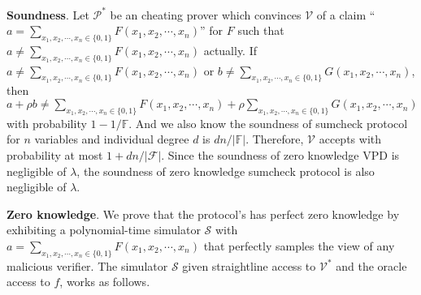 \noindent
\textbf{Soundness}. Let $\mathcal{P}^*$ be an cheating prover which convinces $\mathcal{V}$ of a claim ``$a = \sum\limits_{x_1, x_2, \cdots, x_n \in \{0, 1\}}F(x_1, x_2, \cdots, x_n)$'' for $F$ such that $a \neq \sum\limits_{x_1, x_2, \cdots, x_n \in \{0, 1\}}F(x_1, x_2, \cdots, x_n)$ actually. If $a \neq \sum\limits_{x_1, x_2, \cdots, x_n \in \{0, 1\}}F(x_1, x_2, \cdots, x_n)$ or $b \neq \sum\limits_{x_1, x_2, \cdots, x_n \in \{0, 1\}}G(x_1, x_2, \cdots, x_n)$, then $a + \rho b \neq \sum\limits_{x_1, x_2, \cdots, x_n \in \{0, 1\}}F(x_1, x_2, \cdots, x_n) + \rho \sum\limits_{x_1, x_2, \cdots, x_n \in \{0, 1\}}G(x_1, x_2, \cdots, x_n)$ with probability $1 - 1 / \mathbb{F}$. And we also know the soundness of sumcheck protocol for $n$ variables and individual degree $d$ is $d n /|\mathbb{F}|$. Therefore, $\mathcal{V}$ accepts with probability at most $1 + dn / |\mathcal{F}|$. Since the soundness of zero knowledge VPD is negligible of $\lambda$, the soundness of zero knowledge sumcheck protocol is also negligible of $\lambda$.

\noindent
\textbf{Zero knowledge}. We prove that the protocol's has perfect zero knowledge by exhibiting a polynomial-time simulator $\mathcal{S}$ with $a = \sum\limits_{x_1, x_2, \cdots, x_n \in \{0, 1\}}F(x_1, x_2, \cdots, x_n)$ that perfectly samples the view of any malicious verifier. The simulator $\mathcal{S}$ given straightline access to $\mathcal{V^*}$ and the oracle access to $f$, works as follows.

